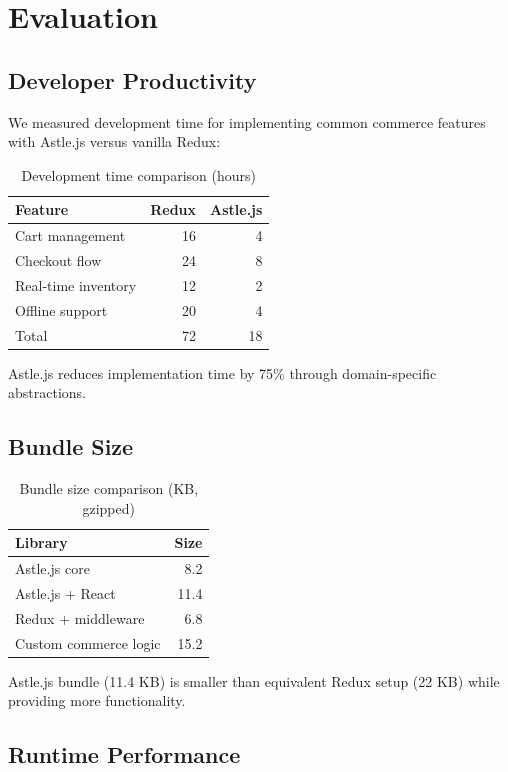 \section{Evaluation}


\subsection{Developer Productivity}

We measured development time for implementing common commerce features with Astle.js versus vanilla Redux:

\begin{table}[h]
\centering
\caption{Development time comparison (hours)}
\label{tab:devtime}
\begin{tabular}{lrr}
\hline
Feature & Redux & Astle.js \\
\hline
Cart management & 16 & 4 \\
Checkout flow & 24 & 8 \\
Real-time inventory & 12 & 2 \\
Offline support & 20 & 4 \\
\hline
Total & 72 & 18 \\
\hline
\end{tabular}
\end{table}

Astle.js reduces implementation time by 75\% through domain-specific abstractions.

\subsection{Bundle Size}

\begin{table}[h]
\centering
\caption{Bundle size comparison (KB, gzipped)}
\label{tab:bundle}
\begin{tabular}{lr}
\hline
Library & Size \\
\hline
Astle.js core & 8.2 \\
Astle.js + React & 11.4 \\
Redux + middleware & 6.8 \\
Custom commerce logic & 15.2 \\
\hline
\end{tabular}
\end{table}

Astle.js bundle (11.4 KB) is smaller than equivalent Redux setup (22 KB) while providing more functionality.

\subsection{Runtime Performance}

